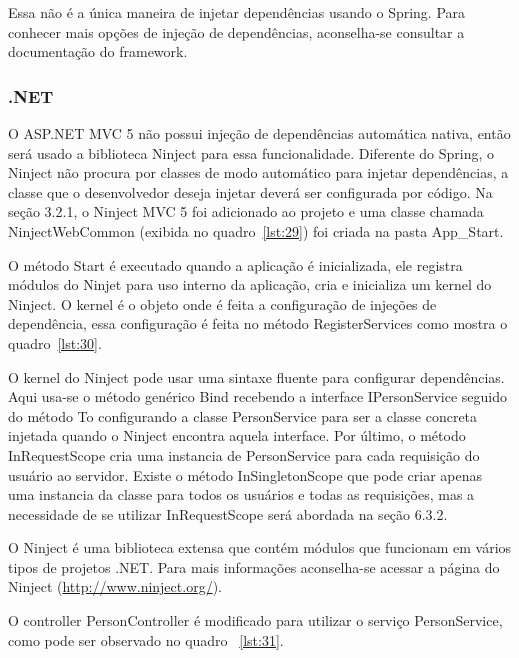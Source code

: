 \documentclass[a4paper,12pt]{article}
\newcommand{\sharpcode}[3] {
	
	\FloatBarrier
}
\begin{document}
Essa não é a única maneira de injetar dependências usando o Spring. Para conhecer mais opções de injeção de dependências, aconselha-se consultar a documentação do framework.

\subsubsection{.NET}

O ASP.NET MVC 5 não possui injeção de dependências automática nativa, então será usado a biblioteca Ninject para essa funcionalidade. Diferente do Spring, o Ninject não procura por classes de modo automático para injetar dependências, a classe que o desenvolvedor deseja injetar deverá ser configurada por código. Na seção 3.2.1, o Ninject MVC 5 foi adicionado ao projeto e uma classe chamada NinjectWebCommon (exibida no quadro~\ref{lst:29}) foi criada na pasta App\_Start. 

\sharpcode{code/29.txt}{Classe NinjectWebCommon}{lst:29}

O método Start é executado quando a aplicação é inicializada, ele registra módulos do Ninjet para uso interno da aplicação, cria e inicializa um kernel do Ninject. O kernel é o objeto onde é feita a configuração de injeções de dependência, essa configuração é feita no método RegisterServices como mostra o quadro~\ref{lst:30}.

\sharpcode{code/30.txt}{Registro de dependências no Ninject}{lst:30}

O kernel do Ninject pode usar uma sintaxe fluente para configurar dependências. Aqui usa-se o método genérico Bind recebendo a interface IPersonService seguido do método To configurando a classe PersonService para ser a classe concreta injetada quando o Ninject encontra aquela interface. Por último, o método InRequestScope cria uma instancia de PersonService para cada requisição do usuário ao servidor. Existe o método InSingletonScope que pode criar apenas uma instancia da classe para todos os usuários e todas as requisições, mas a necessidade de se utilizar InRequestScope será abordada na seção 6.3.2.

O Ninject é uma biblioteca extensa que contém módulos que funcionam em vários tipos de projetos .NET. Para mais informações aconselha-se acessar a página do Ninject (\url{http://www.ninject.org/}).

O controller PersonController é modificado para utilizar o serviço PersonService, como pode ser observado no quadro ~\ref{lst:31}.

\sharpcode{code/31.txt}{PersonController do projeto ASP.NET MVC usando PersonService}{lst:31}
\end{document}
